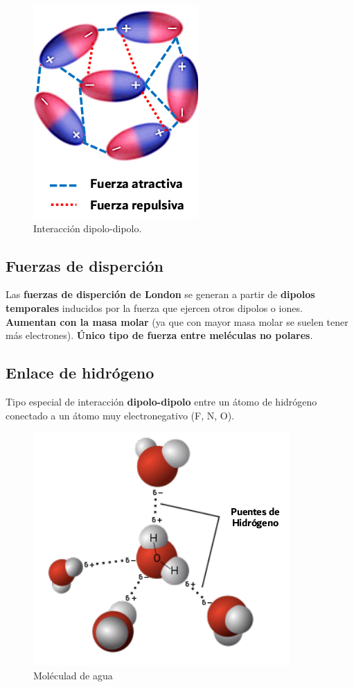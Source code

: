 \documentclass[]{article}
\begin{document}
\begin{figure}[H]
\center
\includegraphics[scale=0.31]{foto7.png}
\caption{Interacción dipolo-dipolo.}
\end{figure}
 
\subsection{Fuerzas de disperción}
Las \textbf{fuerzas de disperción de London} se generan a partir de \textbf{dipolos temporales} inducidos por la fuerza que ejercen otros dipolos o iones. \textbf{Aumentan con la masa molar} (ya que con mayor masa molar se suelen tener más electrones). \textbf{Único tipo de fuerza entre meléculas no polares}.



\subsection{Enlace de hidrógeno}
Tipo especial de interacción \textbf{dipolo-dipolo} entre un átomo de hidrógeno conectado a un átomo muy electronegativo (F, N, O).

\begin{figure}[H]
\center
\includegraphics[scale=0.33]{foto8.png}
\caption{Moléculad de agua}
\end{figure}
\end{document}
